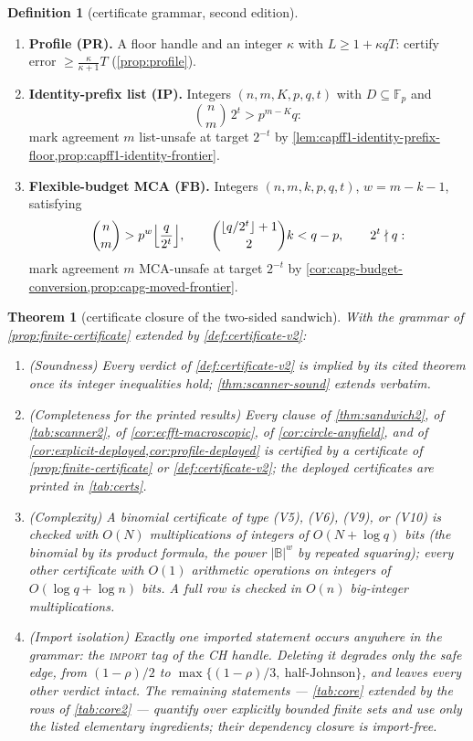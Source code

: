 \documentclass[11pt]{article}
\newtheorem{theorem}{Theorem}[section]
\theoremstyle{definition}
\newtheorem{definition}[definition]{Definition}
\theoremstyle{remark}
\newcommand{\F}{\mathbb{F}}
\newcommand{\B}{\mathbb{B}}
\begin{document}
\begin{definition}[certificate grammar, second edition]
\begin{enumerate}[label=\textup{(V\arabic*)},leftmargin=2.6em,start=5]
\item \textbf{Profile \textup(PR\textup).} A floor handle and an integer $\kappa$ with $L\ge1+\kappa q T$: certify error $\ge\frac{\kappa}{\kappa+1}T$ \textup(\cref{prop:profile}\textup).
\item \textbf{Identity-prefix list \textup(IP\textup).} Integers $(n,m,K,p,q,t)$ with $D\subseteq\F_p$ and
\[
        \binom nm\,2^t>p^{m-K}q:
\]
mark agreement $m$ list-unsafe at target $2^{-t}$ by \cref{lem:capff1-identity-prefix-floor,prop:capff1-identity-frontier}.
\item \textbf{Flexible-budget MCA \textup(FB\textup).} Integers $(n,m,k,p,q,t)$, $w=m-k-1$, satisfying
\[
\binom nm>p^w\Bigl\lfloor\frac q{2^t}\Bigr\rfloor,
\qquad
\binom{\lfloor q/2^t\rfloor+1}{2}k<q-p,
\qquad
2^t\nmid q:
\]
mark agreement $m$ MCA-unsafe at target $2^{-t}$ by \cref{cor:capg-budget-conversion,prop:capg-moved-frontier}.
\end{enumerate}
\end{definition}

\begin{theorem}[certificate closure of the two-sided sandwich]\label{thm:T7-closure}
With the grammar of \cref{prop:finite-certificate} extended by \cref{def:certificate-v2}:
\begin{enumerate}[label=\textup{(\roman*)}]
\item \textup(Soundness\textup) Every verdict of \cref{def:certificate-v2} is implied by its cited theorem once its integer inequalities hold; \cref{thm:scanner-sound} extends verbatim.
\item \textup(Completeness for the printed results\textup) Every clause of \cref{thm:sandwich2}, of \cref{tab:scanner2}, of \cref{cor:ecfft-macroscopic}, of \cref{cor:circle-anyfield}, and of \cref{cor:explicit-deployed,cor:profile-deployed} is certified by a certificate of \cref{prop:finite-certificate} or \cref{def:certificate-v2}; the deployed certificates are printed in \cref{tab:certs}.
\item \textup(Complexity\textup) A binomial certificate of type \textup{(V5)}, \textup{(V6)}, \textup{(V9)}, or \textup{(V10)} is checked with $O(N)$ multiplications of integers of $O(N+\log q)$ bits \textup(the binomial by its product formula, the power $|\B|^w$ by repeated squaring\textup); every other certificate with $O(1)$ arithmetic operations on integers of $O(\log q+\log n)$ bits. A full row is checked in $O(n)$ big-integer multiplications.
\item \textup(Import isolation\textup) Exactly one imported statement occurs anywhere in the grammar: the \textup{\textsc{import}} tag of the CH handle. Deleting it degrades only the safe edge, from $(1-\rho)/2$ to $\max\{(1-\rho)/3,\ \text{half-Johnson}\}$, and leaves every other verdict intact. The remaining statements --- \cref{tab:core} extended by the rows of \cref{tab:core2} --- quantify over explicitly bounded finite sets and use only the listed elementary ingredients; their dependency closure is import-free.
\end{enumerate}
\end{theorem}
\end{document}
